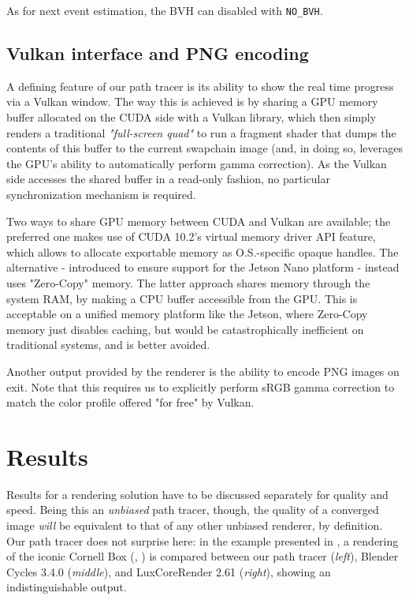 \documentclass[12pt,a4paper]{article}
\begin{document}
As for next event estimation, the BVH can disabled with \verb|NO_BVH|.

\subsection{Vulkan interface and PNG encoding}

A defining feature of our path tracer is its ability to show the real time progress via a Vulkan window. The way this is achieved is by sharing a GPU memory buffer allocated on the CUDA side with a Vulkan library, which then simply renders a traditional \textit{"full-screen quad"} to run a fragment shader that dumps the contents of this buffer to the current swapchain image (and, in doing so, leverages the GPU's ability to automatically perform gamma correction). As the Vulkan side accesses the shared buffer in a read-only fashion, no particular synchronization mechanism is required.

Two ways to share GPU memory between CUDA and Vulkan are available; the preferred one makes use of CUDA 10.2's virtual memory driver API feature, which allows to allocate exportable memory as O.S.-specific opaque handles. The alternative - introduced to ensure support for the Jetson Nano platform - instead uses "Zero-Copy" memory. The latter approach shares memory through the system RAM, by making a CPU buffer accessible from the GPU. This is acceptable on a unified memory platform like the Jetson, where Zero-Copy memory just disables caching, but would be catastrophically inefficient on traditional systems, and is better avoided.

Another output provided by the renderer is the ability to encode PNG images on exit. Note that this requires us to explicitly perform sRGB gamma correction to match the color profile offered "for free" by Vulkan.

\section{Results}

Results for a rendering solution have to be discussed separately for quality and speed. Being this an \textit{unbiased} path tracer, though, the quality of a converged image \textit{will} be equivalent to that of any other unbiased renderer, by definition. Our path tracer does not surprise here: in the example presented in , a rendering of the iconic Cornell Box (\cite{site:Cornell_box}, \cite{wiki:Cornell_box}) is compared between our path tracer (\textit{left}), Blender Cycles 3.4.0 (\textit{middle}), and LuxCoreRender 2.61 (\textit{right}), showing an indistinguishable output.
\end{document}
